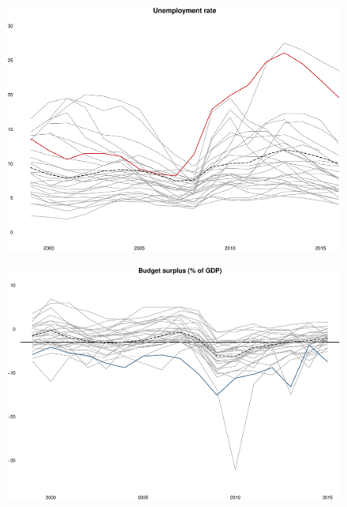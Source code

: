 \documentclass{beamer}
\begin{document}
\begin{frame}
  \begin{figure}
    \includegraphics{unemployment.eps}
  \end{figure}
\end{frame}

  
\begin{frame}
  \begin{figure}
    \includegraphics{budget_surplus.eps}
  \end{figure}
\end{frame}
\end{document}
